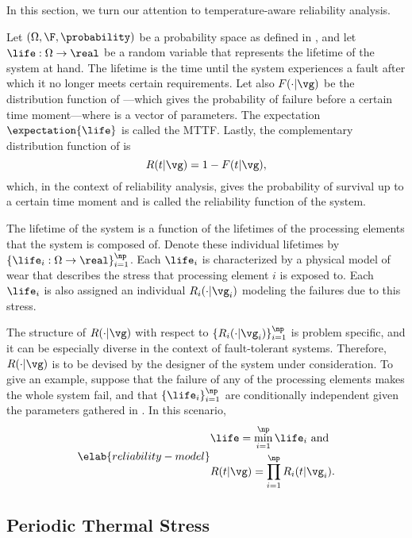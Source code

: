 In this section, we turn our attention to temperature-aware reliability
analysis.

Let $(\Omega, \F, \probability)$ be a probability space as defined in
, and let $\life: \Omega \to \real$ be a random
variable that represents the lifetime of the system at hand. The lifetime is the
time until the system experiences a fault after which it no longer meets certain
requirements. Let also $F(\cdot | \vg)$ be the distribution function of
\life---which gives the probability of failure before a certain time
moment---where \vg is a vector of parameters. The expectation
$\expectation{\life}$ is called the \ac{MTTF}. Lastly, the complementary
distribution function of \life is
\[
  R(t | \vg) = 1 - F(t | \vg),
\]
which, in the context of reliability analysis, gives the probability of survival
up to a certain time moment and is called the reliability function of the
system.

The lifetime \life of the system is a function of the lifetimes of the \np
processing elements that the system is composed of. Denote these individual
lifetimes by $\{ \life_i: \Omega \to \real \}_{i = 1}^\np$. Each $\life_i$ is
characterized by a physical model of wear \cite{jedec2016} that describes the
stress that processing element $i$ is exposed to. Each $\life_i$ is also
assigned an individual $R_i(\cdot | \vg_i)$ modeling the failures due to this
stress.

The structure of $R(\cdot | \vg)$ with respect to $\{ R_i(\cdot | \vg_i) \}_{i =
1}^\np$ is problem specific, and it can be especially diverse in the context of
fault-tolerant systems. Therefore, $R(\cdot | \vg)$ is to be devised by the
designer of the system under consideration. To give an example, suppose that the
failure of any of the \np processing elements makes the whole system fail, and
that $\{ \life_i \}_{i = 1}^\np$ are conditionally independent given the
parameters gathered in \vg. In this scenario,
\begin{equation} \elab{reliability-model}
  \begin{split}
    & \life = \min_{i = 1}^\np \life_i \text{ and} \\
    & R(t | \vg) = \prod_{i = 1}^\np R_i(t | \vg_i).
  \end{split}
\end{equation}

\subsection{Periodic Thermal Stress}

